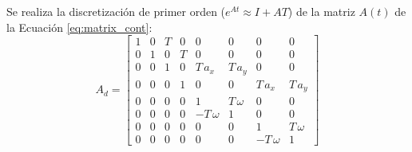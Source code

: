 
Se realiza la discretización de primer orden ($e^{At}\approx I + AT$) de la matriz $A(t)$ de la Ecuación \eqref{eq:matrix_cont}:
		\begin{equation*}
			A_d = \begin{bmatrix}	1& 0& T& 0&           0&           0&           0&           0      \\[0.3em]
						0& 1& 0& T&           0&           0&           0&           0      \\[0.3em]
						0& 0& 1& 0& T\,a_x& T\,a_y&           0&           0 \\[0.3em]
						0& 0& 0& 1&           0&           0& T\,a_x& T\,a_y\\[0.3em]
						0& 0& 0& 0&           1&         T\,\omega&           0&           0\\[0.3em]
						0& 0& 0& 0&        -T\,\omega&           1&           0&           0\\[0.3em]
						0& 0& 0& 0&           0&           0&           1&         T\,\omega\\[0.3em]
						0& 0& 0& 0&           0&           0&        -T\,\omega&           1
			\end{bmatrix}
		\end{equation*}
	
